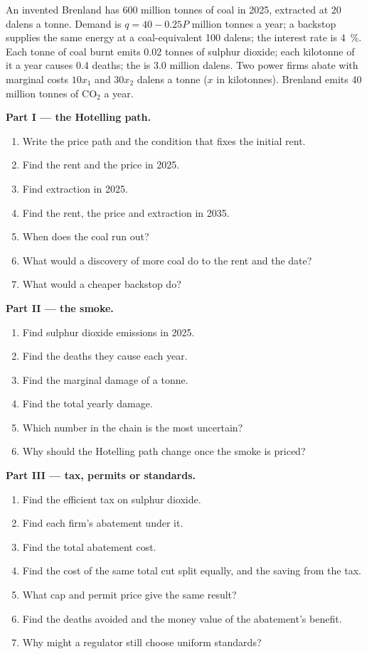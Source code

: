 \begin{problem}\label{pb:b3:environmental-and-resource-economics:coal}
An invented Brenland has 600 million tonnes of coal in 2025, extracted at 20 dalens a tonne. Demand is
$q = 40 - 0.25P$ million tonnes a year; a backstop supplies the same energy at a coal-equivalent 100 dalens; the
interest rate is 4~\%. Each tonne of coal burnt emits 0.02 tonnes of sulphur dioxide; each kilotonne of it a
year causes 0.4 deaths; the  is 3.0 million dalens. Two power firms abate with marginal
costs $10x_1$ and $30x_2$ dalens a tonne ($x$ in kilotonnes). Brenland emits 40 million tonnes of CO$_2$ a year. %

\medskip\noindent\textbf{Part I --- the Hotelling path.}
\begin{enumerate}
\item Write the price path and the condition that fixes the initial rent.
\item Find the rent and the price in 2025.
\item Find extraction in 2025.
\item Find the rent, the price and extraction in 2035.
\item When does the coal run out?
\item What would a discovery of more coal do to the rent and the date?
\item What would a cheaper backstop do?
\end{enumerate}

\medskip\noindent\textbf{Part II --- the smoke.}
\begin{enumerate}[resume]
\item Find sulphur dioxide emissions in 2025.
\item Find the deaths they cause each year.
\item Find the marginal damage of a tonne.
\item Find the total yearly damage.
\item Which number in the chain is the most uncertain?
\item Why should the Hotelling path change once the smoke is priced?
\end{enumerate}

\medskip\noindent\textbf{Part III --- tax, permits or standards.}
\begin{enumerate}[resume]
\item Find the efficient tax on sulphur dioxide.
\item Find each firm's abatement under it.
\item Find the total abatement cost.
\item Find the cost of the same total cut split equally, and the saving from the tax.
\item What cap and permit price give the same result?
\item Find the deaths avoided and the money value of the abatement's benefit.
\item Why might a regulator still choose uniform standards?
\end{enumerate}


\end{problem}
